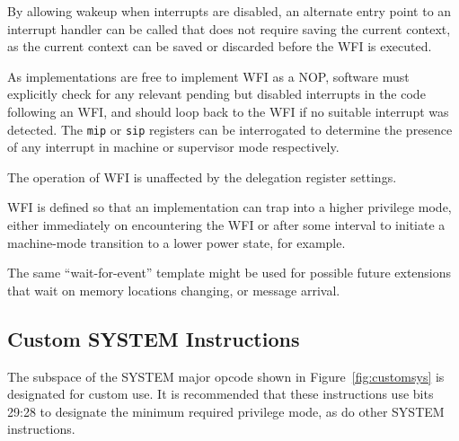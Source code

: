 \begin{commentary}
By allowing wakeup when interrupts are disabled, an alternate entry
point to an interrupt handler can be called that does not require
saving the current context, as the current context can be saved or
discarded before the WFI is executed.

As implementations are free to implement WFI as a NOP, software must
explicitly check for any relevant pending but disabled interrupts in
the code following an WFI, and should loop back to the WFI if no
suitable interrupt was detected.  The {\tt mip} or {\tt sip}
registers can be interrogated to determine the presence
of any interrupt in machine or supervisor mode
respectively.

The operation of WFI is unaffected by the delegation register settings.

WFI is defined so that an implementation can trap into a higher
privilege mode, either immediately on encountering the WFI or after
some interval to initiate a machine-mode transition to a lower power
state, for example.
\end{commentary}

\begin{commentary}
The same ``wait-for-event'' template might be used for possible future
extensions that wait on memory locations changing, or message
arrival.
\end{commentary}

\subsection{Custom SYSTEM Instructions}
\label{sec:customsys}

The subspace of the SYSTEM major opcode shown in Figure~\ref{fig:customsys}
is designated for custom use.
It is recommended that these instructions use bits 29:28 to designate the
minimum required privilege mode, as do other SYSTEM instructions.

